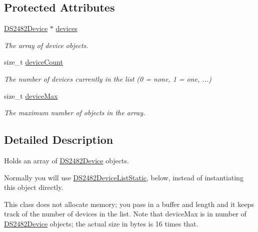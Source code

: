 \subsection*{Protected Attributes}
\begin{DoxyCompactItemize}
\item 
\mbox{\label{class_d_s2482_device_list_a37b73673e20f29e7544d5292617815b2}} 
\mbox{\hyperlink{class_d_s2482_device}{D\+S2482\+Device}} $\ast$ \mbox{\hyperlink{class_d_s2482_device_list_a37b73673e20f29e7544d5292617815b2}{devices}}
\begin{DoxyCompactList}\small\item\em The array of device objects. \end{DoxyCompactList}\item 
\mbox{\label{class_d_s2482_device_list_adf94f4f9e2287e70b4b249991ddb059e}} 
size\+\_\+t \mbox{\hyperlink{class_d_s2482_device_list_adf94f4f9e2287e70b4b249991ddb059e}{device\+Count}}
\begin{DoxyCompactList}\small\item\em The number of devices currently in the list (0 = none, 1 = one, ...) \end{DoxyCompactList}\item 
\mbox{\label{class_d_s2482_device_list_a88e117c26f150a9930dd5b65d5733b69}} 
size\+\_\+t \mbox{\hyperlink{class_d_s2482_device_list_a88e117c26f150a9930dd5b65d5733b69}{device\+Max}}
\begin{DoxyCompactList}\small\item\em The maximum number of objects in the array. \end{DoxyCompactList}\end{DoxyCompactItemize}


\subsection{Detailed Description}
Holds an array of \mbox{\hyperlink{class_d_s2482_device}{D\+S2482\+Device}} objects. 

Normally you will use \mbox{\hyperlink{class_d_s2482_device_list_static}{D\+S2482\+Device\+List\+Static}}, below, instead of instantiating this object directly.

This class does not allocate memory; you pass in a buffer and length and it keeps track of the number of devices in the list. Note that device\+Max is in number of \mbox{\hyperlink{class_d_s2482_device}{D\+S2482\+Device}} objects; the actual size in bytes is 16 times that. 

